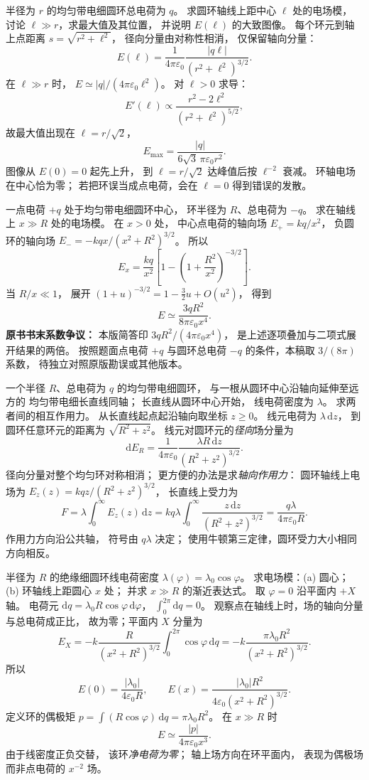 半径为 $r$ 的均匀带电细圆环总电荷为 $q$。
求圆环轴线上距中心 $\ell$ 处的电场模，
讨论 $\ell\gg r$，求最大值及其位置，
并说明 $E(\ell)$ 的大致图像。
\exsolution
每个环元到轴上点距离
$s=\sqrt{r^2+\ell^2}$，
径向分量由对称性相消，
仅保留轴向分量：
\[
E(\ell)=\frac{1}{4\pi\varepsilon_0}
\frac{|q\ell|}{(r^2+\ell^2)^{3/2}}.
\]
在 $\ell\gg r$ 时，
$E\simeq|q|/(4\pi\varepsilon_0\ell^2)$。
对 $\ell>0$ 求导：
\[
E'(\ell)\propto
\frac{r^2-2\ell^2}{(r^2+\ell^2)^{5/2}},
\]
故最大值出现在 $\ell=r/\sqrt2$，
\[
\boxed{E_{\max}=
\frac{|q|}{6\sqrt3\,\pi\varepsilon_0r^2}}.
\]
图像从 $E(0)=0$ 起先上升，
到 $\ell=r/\sqrt2$ 达峰值后按
$\ell^{-2}$ 衰减。
\excheck 环轴电场在中心恰为零；
若把环误当成点电荷，会在 $\ell=0$
得到错误的发散。

一点电荷 $+q$ 处于均匀带电细圆环中心，
环半径为 $R$、总电荷为 $-q$。
求在轴线上 $x\gg R$ 处的电场模。
\exsolution
在 $x>0$ 处，
中心点电荷的轴向场
$E_+=kq/x^2$，
负圆环的轴向场
$E_-=-kq x/(x^2+R^2)^{3/2}$。
所以
\[
E_x=\frac{kq}{x^2}
\left[1-\left(1+\frac{R^2}{x^2}\right)^{-3/2}\right].
\]
当 $R/x\ll1$，
展开
$(1+u)^{-3/2}=1-\frac32u+O(u^2)$，
得到
\[
\boxed{E\simeq
\frac{3qR^2}{8\pi\varepsilon_0x^4}}.
\]
\excheck \textbf{原书书末系数争议：}
本版简答印
$3qR^2/(4\pi\varepsilon_0x^4)$，
是上述逐项叠加与二项式展开结果的两倍。
按照题面点电荷 $+q$ 与圆环总电荷 $-q$
的条件，本稿取 $3/(8\pi)$ 系数，
待独立对照原版勘误或其他版本。

一个半径 $R$、总电荷为 $q$ 的均匀带电细圆环，
与一根从圆环中心沿轴向延伸至远方的
均匀带电细长直线同轴；
长直线从圆环中心开始，
线电荷密度为 $\lambda$。
求两者间的相互作用力。
\exsolution
从长直线起点起沿轴向取坐标 $z\ge0$。
线元电荷为 $\lambda\,\mathrm dz$，
到圆环任意环元的距离为
$\sqrt{R^2+z^2}$。
线元对圆环元的\emph{径向}场分量为
\[
\mathrm dE_R=
\frac1{4\pi\varepsilon_0}
\frac{\lambda R\,\mathrm dz}{(R^2+z^2)^{3/2}}.
\]
径向分量对整个均匀环对称相消；
更方便的办法是求\emph{轴向作用力}：
圆环轴线上电场为
$E_z(z)=kqz/(R^2+z^2)^{3/2}$，
长直线上受力为
\[
F=\lambda\int_0^\infty E_z(z)\,\mathrm dz
=kq\lambda
\int_0^\infty\frac{z\,\mathrm dz}{(R^2+z^2)^{3/2}}
=\boxed{\frac{q\lambda}{4\pi\varepsilon_0R}}.
\]
\excheck 作用力方向沿公共轴，
符号由 $q\lambda$ 决定；
使用牛顿第三定律，圆环受力大小相同方向相反。

半径为 $R$ 的绝缘细圆环线电荷密度
$\lambda(\varphi)=\lambda_0\cos\varphi$。
求电场模：(a) 圆心；
(b) 环轴线上距圆心 $x$ 处；
并求 $x\gg R$ 的渐近表达式。
\exsolution
取 $\varphi=0$ 沿平面内 $+X$ 轴。
电荷元
$\mathrm dq=\lambda_0R\cos\varphi\,\mathrm d\varphi$，
$\int_0^{2\pi}\mathrm dq=0$。
观察点在轴线上时，场的轴向分量与总电荷成正比，
故为零；平面内 $X$ 分量为
\[
E_X=-k\frac{R}{(x^2+R^2)^{3/2}}
\int_0^{2\pi}\cos\varphi\,\mathrm dq
=-k\frac{\pi\lambda_0R^2}{(x^2+R^2)^{3/2}}.
\]
所以
\[
\boxed{E(0)=\frac{|\lambda_0|}{4\varepsilon_0R}},
\qquad
\boxed{E(x)=
\frac{|\lambda_0|R^2}{4\varepsilon_0(x^2+R^2)^{3/2}}}.
\]
定义环的偶极矩
$p=\int(R\cos\varphi)\,\mathrm dq
=\pi\lambda_0R^2$。
在 $x\gg R$ 时
\[
\boxed{E\simeq\frac{|p|}{4\pi\varepsilon_0x^3}}.
\]
\excheck 由于线密度正负交替，
该环\emph{净电荷为零}；
轴上场方向在环平面内，
表现为偶极场而非点电荷的 $x^{-2}$ 场。
